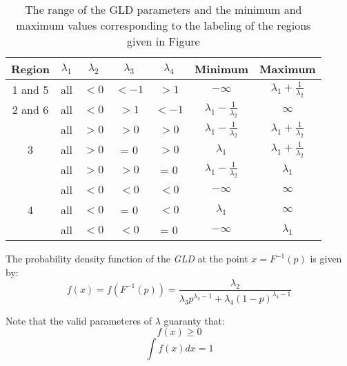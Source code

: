 \begin{table}[]
\centering
\caption{The range of the GLD parameters and the minimum and maximum
values corresponding to the labeling of the regions given in Figure }
\label{my-label}
\begin{tabular}{|c|c|c|c|c|c|c|}
\hline
Region             & $\lambda_{1}$ & $\lambda_{2}$ & $\lambda_{3}$ & $\lambda_{4}$ & Minimum & Maximum \\ \hline
1 and 5            & all            & $< 0$    & $< -1$   & $> 1$ & $-\infty$                             & $\lambda_{1}+\frac{1}{\lambda_{2}}$ \\ \hline
2 and 6            & all            & $< 0$    & $> 1$ & $< -1$   & $\lambda_{1}-\frac{1}{\lambda_{2}}$ & $\infty$                                 \\ \hline
\multirow{3}{*}{3} & all            & $> 0$& $> 0$& $> 0$& $\lambda_{1}-\frac{1}{\lambda_{2}}$ & $\lambda_{1}+\frac{1}{\lambda_{2}}$ \\ \cline{2-7} 
                   & all            & $> 0$& = 0            & $> 0$& $\lambda_{1}$                       & $\lambda_{1}+\frac{1}{\lambda_{2}}$ \\ \cline{2-7} 
                   & all            & $> 0$& $> 0$& = 0            & $\lambda_{1}-\frac{1}{\lambda_{2}}$ & $\lambda_{1}$                       \\ \hline
\multirow{3}{*}{4} & all            & $< 0$    & $< 0$    & $< 0$    & $-\infty$                               & $\infty$                                 \\ \cline{2-7} 
                   & all            & $< 0$    & = 0            & $< 0$    & $\lambda_{1}$                       & $\infty$                                 \\ \cline{2-7} 
                   & all            & $< 0$    & $< 0$    & = 0            & $-\infty$                               & $\lambda_{1}$  
\end{tabular}
\end{table}

The probability density function of the \textit{GLD} at the point $x=F^{-1}(p)$ is given by:
\begin{equation}
f(x)=f(F^{-1}(p))=\frac{\lambda_{2}}{\lambda_{3}p^{\lambda_{3}-1}+\lambda_{4}(1-p)^{\lambda_{4}-1}}
\end{equation}

Note that the valid parameteres of $\lambda$ guaranty that:
\begin{equation}
f(x) \geqslant 0
\end{equation}
\begin{equation}
\int f(x)dx=1
\end{equation}

